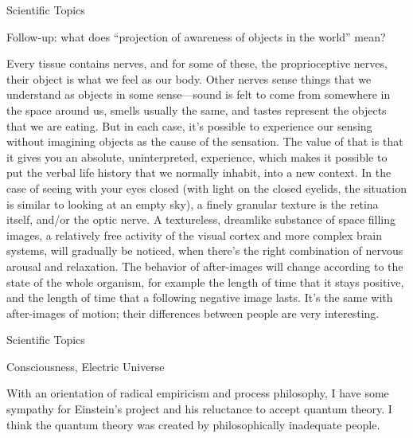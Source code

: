 \documentclass[11pt,oneside,openany,extrafontsizes]{memoir}
\begin{document}
\begin{qaexchange}{Scientific Topics}

    \begin{question}
        Follow-up: what does \enquote{projection of awareness of objects in the world} mean?
    \end{question}

    \begin{answer}
        Every tissue contains nerves, and for some of these, the proprioceptive nerves, their object is what we feel as our body. Other nerves sense things that we understand as objects in some sense---sound is felt to come from somewhere in the space around us, smells usually the same, and tastes represent the objects that we are eating. But in each case, it's possible to experience our sensing without imagining objects as the cause of the sensation. The value of that is that it gives you an absolute, uninterpreted, experience, which makes it possible to put the verbal life history that we normally inhabit, into a new context. In the case of seeing with your eyes closed (with light on the closed eyelids, the situation is similar to looking at an empty sky), a finely granular texture is the retina itself, and/or the optic nerve. A textureless, dreamlike substance of space filling images, a relatively free activity of the visual cortex and more complex brain systems, will gradually be noticed, when there's the right combination of nervous arousal and relaxation. The behavior of after-images will change according to the state of the whole organism, for example the length of time that it stays positive, and the length of time that a following negative image lasts. It's the same with after-images of motion; their differences between people are very interesting.
    \end{answer}
\end{qaexchange}

\begin{standalonequote}{Scientific Topics}
    \begin{note}
        Consciousness, Electric Universe
    \end{note}

    \begin{answer}
        With an orientation of radical empiricism and process philosophy, I have some sympathy for Einstein's project and his reluctance to accept quantum theory. I think the quantum theory was created by philosophically inadequate people.
    \end{answer}
\end{standalonequote}
\end{document}
